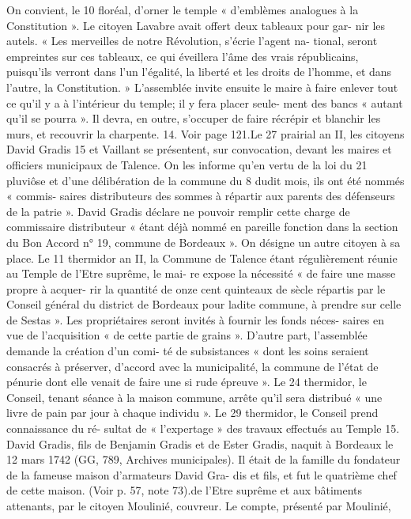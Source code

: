 \documentclass[a4paper,11pt]{book}
\begin{document}
On convient, le 10 floréal, d'orner le temple « d'emblèmes
analogues à la Constitution ».
Le citoyen Lavabre avait offert deux tableaux pour gar-
nir les autels.
« Les merveilles de notre Révolution, s'écrie l'agent na-
tional, seront empreintes sur ces tableaux, ce qui éveillera
l'âme des vrais républicains, puisqu'ils verront dans l'un
l'égalité, la liberté et les droits de l'homme, et dans l'autre,
la Constitution. »
L'assemblée invite ensuite le maire à faire enlever tout
ce qu'il y a à l'intérieur du temple; il y fera placer seule-
ment des bancs « autant qu'il se pourra ». Il devra, en
outre, s'occuper de faire récrépir et blanchir les murs,
et recouvrir la charpente.
14. Voir page 121.Le 27 prairial an II, les citoyens David Gradis 15 et
Vaillant se présentent, sur convocation, devant les maires
et officiers municipaux de Talence. On les informe qu'en
vertu de la loi du 21 pluviôse et d'une délibération de la
commune du 8 dudit mois, ils ont été nommés « commis-
saires distributeurs des sommes à répartir aux parents
des défenseurs de la patrie ».
David Gradis déclare ne pouvoir remplir cette charge
de commissaire distributeur « étant déjà nommé en pareille
fonction dans la section du Bon Accord n° 19, commune
de Bordeaux ». On désigne un autre citoyen à sa place.
Le 11 thermidor an II, la Commune de Talence étant
régulièrement réunie au Temple de l'Etre suprême, le mai-
re expose la nécessité « de faire une masse propre à acquer-
rir la quantité de onze cent quinteaux de sècle répartis par
le Conseil général du district de Bordeaux pour ladite
commune, à prendre sur celle de Sestas ».
Les propriétaires seront invités à fournir les fonds néces-
saires en vue de l'acquisition « de cette partie de grains ».
D'autre part, l'assemblée demande la création d'un comi-
té de subsistances « dont les soins seraient consacrés à
préserver, d'accord avec la municipalité, la commune de
l'état de pénurie dont elle venait de faire une si rude
épreuve ».
Le 24 thermidor, le Conseil, tenant séance à la maison
commune, arrête qu'il sera distribué « une livre de pain
par jour à chaque individu ».
Le 29 thermidor, le Conseil prend connaissance du ré-
sultat de « l'expertage » des travaux effectués au Temple
15. David Gradis, fils de Benjamin Gradis et de Ester Gradis, naquit
à Bordeaux le 12 mars 1742 (GG, 789, Archives municipales). Il était
de la famille du fondateur de la fameuse maison d'armateurs David Gra-
dis et fils, et fut le quatrième chef de cette maison. (Voir p. 57, note 73).de l'Etre suprême et aux bâtiments attenants, par le citoyen
Moulinié, couvreur. Le compte, présenté par Moulinié,
\end{document}
